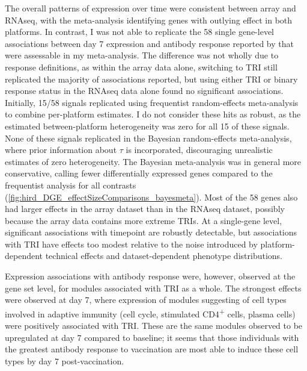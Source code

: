 The overall patterns of expression over time were consistent between array and  \gls{RNAseq}, with the meta-analysis identifying genes with outlying effect in both platforms.
In contrast, I was not able to replicate the 58 single gene-level associations between day 7 expression and antibody response reported by \textcite{sobolev2016AdjuvantedInfluenzaH1N1Vaccination} that were assessable in my meta-analysis.
The difference was not wholly due to response definitions, as within the array data alone, switching to \gls{TRI} still replicated the majority of associations reported,
but using either \gls{TRI} or binary response status in the \gls{RNAseq} data alone found no significant associations.
Initially, 15/58 signals replicated using frequentist random-effects meta-analysis to combine per-platform estimates.
I do not consider these hits as robust, as the estimated between-platform heterogeneity was zero for all 15 of these signals.
None of these signals replicated in the Bayesian random-effects meta-analysis,
where prior information about $\tau$ is incorporated, discouraging unrealistic estimates of zero heterogeneity.
The Bayesian meta-analysis was in general more conservative, calling fewer differentially expressed genes compared to the frequentist analysis for all contrasts (\cref{fig:hird_DGE_effectSizeComparisons_bayesmeta}).
Most of the 58 genes also had larger effects in the array dataset than in the \gls{RNAseq} dataset, possibly because the array data contains more extreme \glspl{TRI}.
At a single-gene level, significant associations with timepoint are robustly detectable, 
but associations with \gls{TRI} have effects too modest relative to the noise introduced by platform-dependent technical effects and dataset-dependent phenotype distributions.
%

Expression associations with antibody response were, however, observed at the gene set level, for modules associated with \gls{TRI} as a whole.
The strongest effects were observed at day 7, where expression of modules suggesting of cell types involved in adaptive immunity (cell cycle, stimulated CD4\textsuperscript{+} cells, plasma cells) were positively associated with \gls{TRI}.
These are the same modules observed to be upregulated at day 7 compared to baseline; it seems that those individuals with the greatest antibody response to vaccination are most able to induce these cell types by day 7 post-vaccination.

